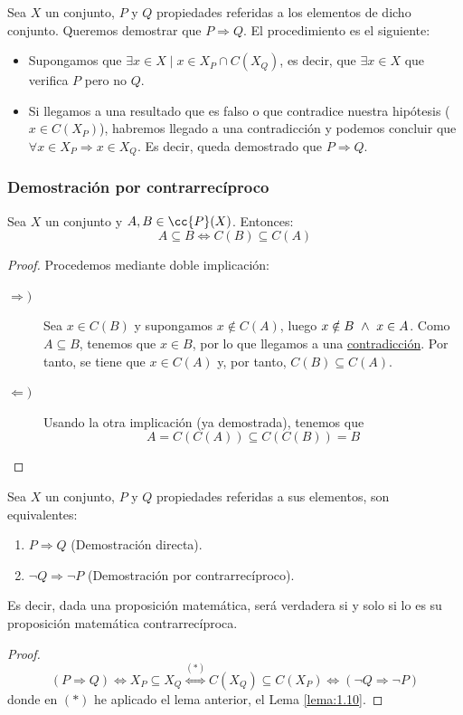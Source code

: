 Sea $X$ un conjunto, $P$ y $Q$ propiedades referidas a los elementos de dicho conjunto. Queremos demostrar que $P \Rightarrow Q$. El procedimiento es el siguiente:

\begin{itemize}
    \item Supongamos que $\exists x \in X \mid x \in X_P\cap C(X_Q)$, es decir, que $\exists x\in X$ que verifica $P$ pero no $Q$.
    
    \item Si llegamos a una resultado que es falso o que contradice nuestra hipótesis ($x\in C(X_P)$), habremos llegado a una contradicción y podemos concluir que $\forall x \in X_P \Longrightarrow x \in X_Q$. Es decir, queda demostrado que $P \Longrightarrow Q$.
\end{itemize}

\subsubsection{Demostración por contrarrecíproco}

\begin{lema}\label{lema:1.10}
    Sea $X$ un conjunto y $A, B \in \cc{P}(X)$. Entonces:
    $$A \subseteq B \Longleftrightarrow C(B) \subseteq C(A)$$
\end{lema}
\begin{proof} Procedemos mediante doble implicación:
\begin{description}
    \item [$\Longrightarrow)$] Sea $x \in C(B)$ y supongamos $x \notin C(A)$, luego $x \notin B \ \land \  x \in A$. Como $A\subseteq B$, tenemos que $x\in B$, por lo que llegamos a una \underline{contradicción}. Por tanto, se tiene que $x\in C(A)$ y, por tanto, $C(B)\subseteq C(A)$.

    \item [$\Longleftarrow)$] Usando la otra implicación (ya demostrada), tenemos que $$A = C(C(A)) \subseteq C(C(B)) = B$$
\end{description}
\end{proof}

\begin{prop}
    Sea $X$ un conjunto, $P$ y $Q$ propiedades referidas a sus elementos, son equivalentes:
    \begin{enumerate}
        \item $P \Rightarrow Q$ (Demostración directa).
        \item $\neg Q \Rightarrow \neg P$ (Demostración por contrarrecíproco).
    \end{enumerate}
    Es decir, dada una proposición matemática, será verdadera si y solo si lo es su proposición matemática contrarrecíproca.
\end{prop}
\begin{proof}
\begin{equation*}
    (P \Rightarrow Q) \Leftrightarrow X_P \subseteq X_Q
    \stackrel{(\ast)}{\Longleftrightarrow}
    C(X_Q) \subseteq C(X_P) \Longleftrightarrow (\neg Q \Rightarrow \neg P)
\end{equation*}
donde en $(\ast)$ he aplicado el lema anterior, el Lema \ref{lema:1.10}.
\end{proof}

